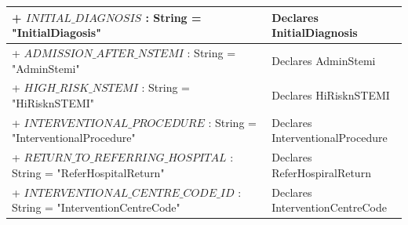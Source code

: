 \documentclass[12pt,a4paper,oneside,titlepage]{article}
\begin{document}
\begin{center}
\begin{tabular}{| p{13cm} | p{5cm} |}
	+ \underline{$INITIAL\_DIAGNOSIS$} : String = "InitialDiagosis" & Declares InitialDiagnosis \\ \hline
	+ \underline{$ADMISSION\_AFTER\_NSTEMI$} : String = "AdminStemi" & Declares AdminStemi \\ \hline
	+ \underline{$HIGH\_RISK\_NSTEMI$} : String = "HiRisknSTEMI" & Declares HiRisknSTEMI \\ \hline
	+ \underline{$INTERVENTIONAL\_PROCEDURE$} : String = "InterventionalProcedure" & Declares InterventionalProcedure \\ \hline
	+ \underline{$RETURN\_TO\_REFERRING\_HOSPITAL$} : String = "ReferHospitalReturn" & Declares ReferHospiralReturn \\ \hline
	+ \underline{$INTERVENTIONAL\_CENTRE\_CODE\_ID$} : String = "InterventionCentreCode" & Declares InterventionCentreCode \\ \hline
	\end{tabular}
\end{center}	
	
\end{document}
